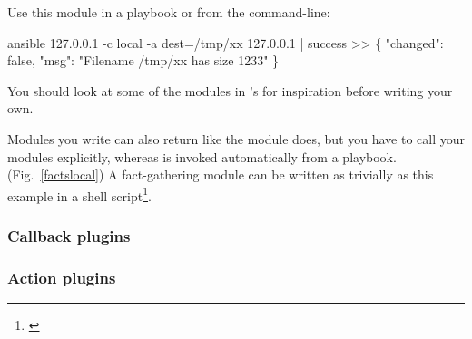 Use this module in a playbook or from the command-line:

\begin{extymeta}
ansible 127.0.0.1 -c local  -a dest=/tmp/xx
127.0.0.1 | success >> \{
    "changed": false, 
    "msg": "Filename /tmp/xx has size 1233"
\}
\end{extymeta}

You should look at some of the modules in \ansible{}'s  for
inspiration before writing your own.

Modules you write can also return  like the  module does, but
you have to call your modules explicitly, whereas  is invoked
automatically from a playbook. (Fig.~\ref{factslocal}) A fact-gathering module
can be written as trivially as this example in a shell script\footnote{\url{}}.



\subsubsection*{Callback plugins}

\subsubsection*{Action plugins}
